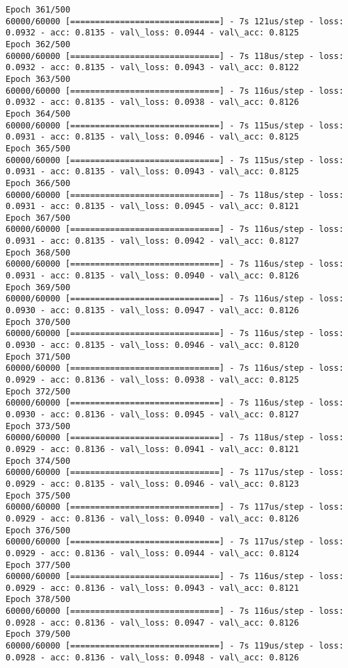 \documentclass[11pt]{article}
\begin{document}
\begin{Verbatim}[commandchars=\\\{\}]
Epoch 361/500
60000/60000 [==============================] - 7s 121us/step - loss: 0.0932 - acc: 0.8135 - val\_loss: 0.0944 - val\_acc: 0.8125
Epoch 362/500
60000/60000 [==============================] - 7s 118us/step - loss: 0.0932 - acc: 0.8135 - val\_loss: 0.0943 - val\_acc: 0.8122
Epoch 363/500
60000/60000 [==============================] - 7s 116us/step - loss: 0.0932 - acc: 0.8135 - val\_loss: 0.0938 - val\_acc: 0.8126
Epoch 364/500
60000/60000 [==============================] - 7s 115us/step - loss: 0.0931 - acc: 0.8135 - val\_loss: 0.0946 - val\_acc: 0.8125
Epoch 365/500
60000/60000 [==============================] - 7s 115us/step - loss: 0.0931 - acc: 0.8135 - val\_loss: 0.0943 - val\_acc: 0.8125
Epoch 366/500
60000/60000 [==============================] - 7s 118us/step - loss: 0.0931 - acc: 0.8135 - val\_loss: 0.0945 - val\_acc: 0.8121
Epoch 367/500
60000/60000 [==============================] - 7s 116us/step - loss: 0.0931 - acc: 0.8135 - val\_loss: 0.0942 - val\_acc: 0.8127
Epoch 368/500
60000/60000 [==============================] - 7s 116us/step - loss: 0.0931 - acc: 0.8135 - val\_loss: 0.0940 - val\_acc: 0.8126
Epoch 369/500
60000/60000 [==============================] - 7s 116us/step - loss: 0.0930 - acc: 0.8135 - val\_loss: 0.0947 - val\_acc: 0.8126
Epoch 370/500
60000/60000 [==============================] - 7s 116us/step - loss: 0.0930 - acc: 0.8135 - val\_loss: 0.0946 - val\_acc: 0.8120
Epoch 371/500
60000/60000 [==============================] - 7s 116us/step - loss: 0.0929 - acc: 0.8136 - val\_loss: 0.0938 - val\_acc: 0.8125
Epoch 372/500
60000/60000 [==============================] - 7s 116us/step - loss: 0.0930 - acc: 0.8136 - val\_loss: 0.0945 - val\_acc: 0.8127
Epoch 373/500
60000/60000 [==============================] - 7s 118us/step - loss: 0.0929 - acc: 0.8136 - val\_loss: 0.0941 - val\_acc: 0.8121
Epoch 374/500
60000/60000 [==============================] - 7s 117us/step - loss: 0.0929 - acc: 0.8135 - val\_loss: 0.0946 - val\_acc: 0.8123
Epoch 375/500
60000/60000 [==============================] - 7s 117us/step - loss: 0.0929 - acc: 0.8136 - val\_loss: 0.0940 - val\_acc: 0.8126
Epoch 376/500
60000/60000 [==============================] - 7s 117us/step - loss: 0.0929 - acc: 0.8136 - val\_loss: 0.0944 - val\_acc: 0.8124
Epoch 377/500
60000/60000 [==============================] - 7s 116us/step - loss: 0.0929 - acc: 0.8136 - val\_loss: 0.0943 - val\_acc: 0.8121
Epoch 378/500
60000/60000 [==============================] - 7s 116us/step - loss: 0.0928 - acc: 0.8136 - val\_loss: 0.0947 - val\_acc: 0.8126
Epoch 379/500
60000/60000 [==============================] - 7s 119us/step - loss: 0.0928 - acc: 0.8136 - val\_loss: 0.0948 - val\_acc: 0.8126

\end{Verbatim}
\end{document}
